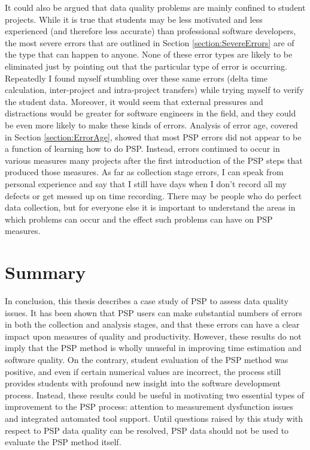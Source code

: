 It could also be argued that data quality problems are mainly confined to
student projects. While it is true that students may be less motivated and
less experienced (and therefore less accurate) than professional software
developers, the most severe errors that are outlined in Section
\ref{section:SevereErrors} are of the type that can happen to anyone.  None
of these error types are likely to be eliminated just by pointing out that
the particular type of error is occurring.  Repeatedly I found myself
stumbling over these same errors (delta time calculation, inter-project and
intra-project transfers) while trying myself to verify the student data.
Moreover, it would seem that external pressures and distractions would be
greater for software engineers in the field, and they could be even more
likely to make these kinds of errors.  Analysis of error age, covered in
Section \ref{section:ErrorAge}, showed that most PSP errors did not appear
to be a function of learning how to do PSP.  Instead, errors continued to
occur in various measures many projects after the first introduction of the
PSP steps that produced those measures.  As far as collection stage errors,
I can speak from personal experience and say that I still have days when I
don't record all my defects or get messed up on time recording.  There may
be people who do perfect data collection, but for everyone else it is
important to understand the areas in which problems can occur and the
effect such problems can have on PSP measures.


\section{Summary}
In conclusion, this thesis describes a case study of PSP to assess data
quality issues.  It has been shown that PSP users can make substantial
numbers of errors in both the collection and analysis stages, and that
these errors can have a clear impact upon measures of quality and
productivity.  However, these results do not imply that the PSP method is
wholly unuseful in improving time estimation and software quality.  On the
contrary, student evaluation of the PSP method was positive, and even if
certain numerical values are incorrect, the process still provides students
with profound new insight into the software development process.  Instead,
these results could be useful in motivating two essential types of
improvement to the PSP process: attention to measurement dysfunction issues
and integrated automated tool support.  Until questions raised by this
study with respect to PSP data quality can be resolved, PSP data should not
be used to evaluate the PSP method itself.
 
